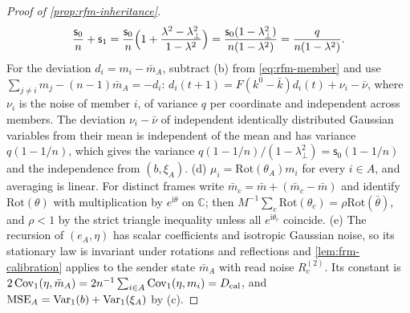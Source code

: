 \begin{proof}[Proof of \cref{prop:rfm-inheritance}]
\begin{equation*}
\frac{\mathsf s_0}{n}+\mathsf s_1=\frac{\mathsf s_0}{n}\Bigl(1+\frac{\lambda^2-\lambda_\perp^2}{1-\lambda^2}\Bigr)=\frac{\mathsf s_0(1-\lambda_\perp^2)}{n(1-\lambda^2)}=\frac{q}{n(1-\lambda^2)}.
\end{equation*}
For the deviation $d_i=m_i-\bar m_A$, subtract (b) from \eqref{eq:rfm-member} and use $\sum_{j\ne i}m_j-(n-1)\bar m_A=-d_i$: $d_i(t+1)=F(k^0-\bar k)d_i(t)+\nu_i-\bar\nu$, where $\nu_i$ is the noise of member $i$, of variance $q$ per coordinate and independent across members. The deviation $\nu_i-\bar\nu$ of independent identically distributed Gaussian variables from their mean is independent of the mean and has variance $q(1-1/n)$, which gives the variance $q(1-1/n)/(1-\lambda_\perp^2)=\mathsf s_0(1-1/n)$ and the independence from $(b,\xi_A)$.
(d) $\mu_i=\mathrm{Rot}(\theta_A)m_i$ for every $i\in A$, and averaging is linear. For distinct frames write $\bar m_c=\bar m+(\bar m_c-\bar m)$ and identify $\mathrm{Rot}(\theta)$ with multiplication by $e^{\mathrm i\theta}$ on $\mathbb C$; then $M^{-1}\sum_c\mathrm{Rot}(\theta_c)=\rho\mathrm{Rot}(\bar\theta)$, and $\rho<1$ by the strict triangle inequality unless all $e^{\mathrm i\theta_c}$ coincide.
(e) The recursion of $(e_A,\eta)$ has scalar coefficients and isotropic Gaussian noise, so its stationary law is invariant under rotations and reflections and \cref{lem:frm-calibration} applies to the sender state $\bar m_A$ with read noise $R_c^{(2)}$. Its constant is $2\operatorname{Cov}_1(\eta,\bar m_A)=2n^{-1}\sum_{i\in A}\operatorname{Cov}_1(\eta,m_i)=D_{\mathrm{cal}}$, and $\mathrm{MSE}_A=\operatorname{Var}_1(b)+\operatorname{Var}_1(\xi_A)$ by (c).
\end{proof}

